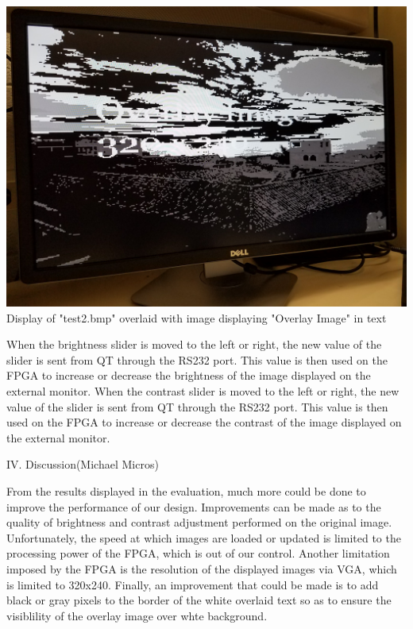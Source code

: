 \documentclass{article}
\newenvironment{Figure}
  {\par\medskip\noindent\ignorespaces\minipage{\linewidth}}
  {\endminipage\par\medskip}
\begin{document}
\begin{multicols*}{2}
\begin{Figure}
 \centering
 \includegraphics[width=\linewidth]{overlaid_image.jpg}
   {Display of "test2.bmp" overlaid with image displaying "Overlay Image" in text}
\end{Figure}


When the brightness slider is moved to the left or right, the new value of the slider is sent from QT through the RS232 port. This value is then used on the FPGA to increase or decrease the brightness of the image displayed on the external monitor. 
When the contrast slider is moved to the left or right, the new value of the slider is sent from QT through the RS232 port. This value is then used on the FPGA to increase or decrease the contrast of the image displayed on the external monitor.


\begin{center}
\large{IV. Discussion(Michael Micros)}
\end{center}
From the results displayed in the evaluation,  much more could be done to improve the performance of our design. Improvements can be made as to the quality of brightness and contrast adjustment performed on the original image. Unfortunately, the speed at which images are loaded or updated is limited to the processing power of the FPGA, which is out of our control. Another limitation imposed by the FPGA is the resolution of the displayed images via VGA, which is limited to 320x240. Finally, an improvement that could be made is to add black or gray pixels to the border of the white overlaid text so as to ensure the visiblility of the overlay image over whte background.



\end{multicols*}
\end{document}
